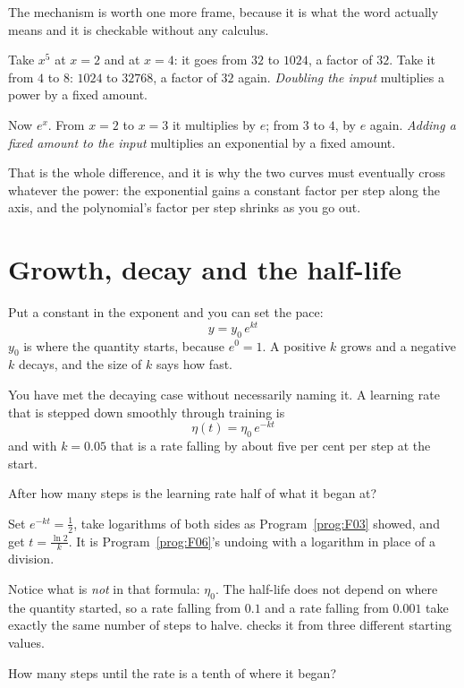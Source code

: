 \begin{fr}
The mechanism is worth one more frame, because it is what the word actually
means and it is checkable without any calculus.

Take $x^{5}$ at $x = 2$ and at $x = 4$: it goes from $32$ to $1024$, a factor
of $32$. Take it from $4$ to $8$: $1024$ to $32768$, a factor of $32$ again.
\emph{Doubling the input} multiplies a power by a fixed amount.

Now $e^{x}$. From $x = 2$ to $x = 3$ it multiplies by $e$; from $3$ to $4$, by
$e$ again. \emph{Adding a fixed amount to the input} multiplies an exponential
by a fixed amount.

That is the whole difference, and it is why the two curves must eventually
cross whatever the power: the exponential gains a constant factor per step
along the axis, and the polynomial's factor per step shrinks as you go out.
\end{fr}


\section{Growth, decay and the half-life}
\label{sec:F07-decay}

\begin{fr}
Put a constant in the exponent and you can set the pace:
\[ y = y_0\,e^{kt} \]
$y_0$ is where the quantity starts, because $e^{0} = 1$. A positive $k$ grows
and a negative $k$ decays, and the size of $k$ says how fast.

You have met the decaying case without necessarily naming it. A learning rate
that is stepped down smoothly through training is
\[ \eta(t) = \eta_0\,e^{-kt} \]
and with $k = \num{0.05}$ that is a rate falling by about five per cent per
step at the start.

After how many steps is the learning rate half of what it began at?
\nextframe
\end{fr}

\begin{fr}
Set $e^{-kt} = \frac{1}{2}$, take logarithms of both sides as
Program~\ref{prog:F03} showed, and get $t = \frac{\ln 2}{k}$. It is
Program~\ref{prog:F06}'s undoing with a logarithm in place of a division.

Notice what is \emph{not} in that formula: $\eta_0$. The half-life does not
depend on where the quantity started, so a rate falling from $\num{0.1}$ and a
rate falling from $\num{0.001}$ take exactly the same number of steps to halve.
 checks it from three different starting values.

How many steps until the rate is a tenth of where it began?
\nextframe
\end{fr}

